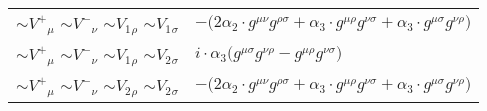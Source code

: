\begin{center}
\begin{tabular}{|l|l|}
$\sim V^+{}_{\mu }$ \phantom{-} $\sim V^-{}_{\nu }$ \phantom{-} $\sim V_1{}_{\rho }$ \phantom{-} $\sim V_1{}_{\sigma }$ \phantom{-}  &
	$-\big(2 \alpha_2\cdot g^{\mu \nu} g^{\rho \sigma} + \alpha_3\cdot g^{\mu \rho} g^{\nu \sigma} + \alpha_3\cdot g^{\mu \sigma} g^{\nu \rho} \big)$\\[2mm]
$\sim V^+{}_{\mu }$ \phantom{-} $\sim V^-{}_{\nu }$ \phantom{-} $\sim V_1{}_{\rho }$ \phantom{-} $\sim V_2{}_{\sigma }$ \phantom{-}  &
	$ i \cdot \alpha_3\big(g^{\mu \sigma} g^{\nu \rho} -g^{\mu \rho} g^{\nu \sigma} \big)$\\[2mm]
$\sim V^+{}_{\mu }$ \phantom{-} $\sim V^-{}_{\nu }$ \phantom{-} $\sim V_2{}_{\rho }$ \phantom{-} $\sim V_2{}_{\sigma }$ \phantom{-}  &
	$-\big(2 \alpha_2\cdot g^{\mu \nu} g^{\rho \sigma} + \alpha_3\cdot g^{\mu \rho} g^{\nu \sigma} + \alpha_3\cdot g^{\mu \sigma} g^{\nu \rho} \big)$\\ \hline
\end{tabular}


\end{center}
